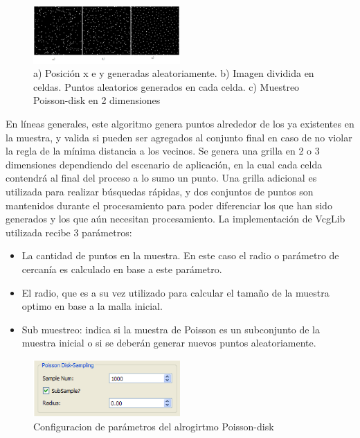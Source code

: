 \begin{figure}[H]
  \centering
    \includegraphics[width=0.5\textwidth]{./Cap6_reconstruccion/malla-poisson.png}
  \caption{a) Posición x e y generadas aleatoriamente. b) Imagen dividida en celdas. Puntos aleatorios generados en cada celda. c) Muestreo Poisson-disk en 2 dimensiones}
  \label{fig:Mesh-Poisson}
\end{figure}

En líneas generales, este algoritmo genera puntos alrededor de los ya existentes en la muestra, y valida si pueden ser agregados al conjunto final en caso de no violar la regla de la mínima distancia a los vecinos. Se genera una grilla en 2 o 3 dimensiones dependiendo del escenario de aplicación, en la cual cada celda contendrá al final del proceso a lo sumo un punto. Una grilla adicional es utilizada para realizar búsquedas rápidas, y dos conjuntos de puntos son mantenidos durante el procesamiento para poder diferenciar los que han sido generados y los que aún necesitan procesamiento.
La implementación de VcgLib utilizada recibe 3 parámetros:
\begin{itemize}
	\item La cantidad de puntos en la muestra. En este caso el radio o parámetro de cercanía es calculado en base a este parámetro.
	\item El radio, que es a su vez utilizado para calcular el tamaño de la muestra optimo en base a la malla inicial.
	\item Sub muestreo: indica si la muestra de Poisson es un subconjunto de la muestra inicial o si se deberán generar nuevos puntos aleatoriamente.
\end{itemize}

\begin{figure}[H]
  \centering
    \includegraphics[width=0.5\textwidth]{./Cap6_reconstruccion/malla-poissongui.png}
  \caption{Configuracion de parámetros del alrogirtmo Poisson-disk}
  \label{fig:Mesh-PoissonGui}
\end{figure}

